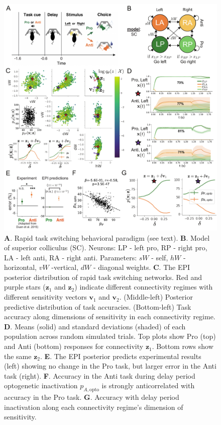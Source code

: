 \documentclass[11pt]{article}
\begin{document}
\begin{figure}
\begin{center}
\includegraphics[scale=0.8]{figures/fig3/fig3.pdf}
\end{center}
\caption{\footnotesize 
\textbf{A}. Rapid task switching behavioral paradigm (see text). 
\textbf{B}. Model of superior colliculus (SC). Neurons: LP - left pro, RP - right pro, LA - left anti, RA - right anti. 
Parameters: $sW$ - self, $hW$ - horizontal, $vW$ -vertical, $dW$ - diagonal weights.  
\textbf{C}. The EPI posterior distribution of rapid task switching networks.  
Red and purple stars ($\mathbf{z}_1$ and $\mathbf{z}_2$) indicate different connectivity regimes with different sensitivity vectors $\mathbf{v}_1$ and $\mathbf{v}_2$.
(Middle-left) Posterior predictive distribution of task accuracies.
(Bottom-left) Task accuracy along dimensions of sensitivity in each connectivity regime.
\textbf{D}. Means (solid) and standard deviations (shaded) of each population across random simulated trials.
Top plots show Pro (top) and Anti (bottom) responses for connectivity $\mathbf{z}_1$.
Bottom rows show the same $\mathbf{z}_2$.
\textbf{E}. The EPI posterior predicts experimental results (left) showing no change in the Pro task, but larger error in the Anti task (right).
\textbf{F}. Accuracy in the Anti task during delay period optogenetic inactivation $p_{A,\text{opto}}$ is strongly anticorrelated with accuracy in the Pro task.
\textbf{G}. Accuracy with delay period inactivation along each connectivity regime's dimension of sensitivity.
}
\label{fig:SC}
\end{figure}
\end{document}
